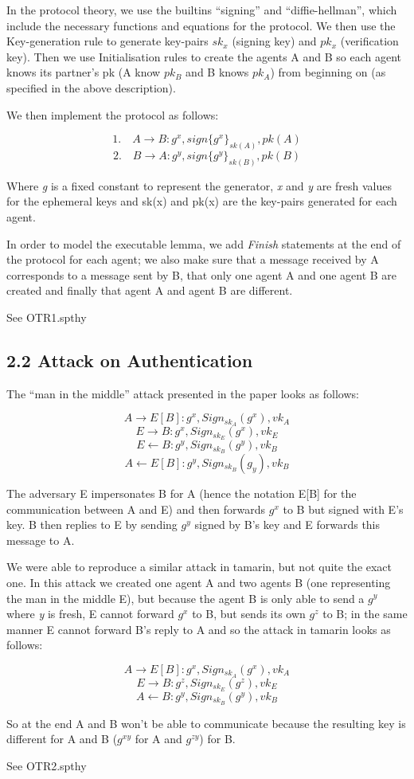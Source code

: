 \documentclass[
]{article}
\begin{document}
In the protocol theory, we use the builtins ``signing'' and
``diffie-hellman'', which include the necessary functions and equations for the protocol. We then use the Key-generation rule to generate key-pairs $sk_x$ (signing key) and $pk_x$ (verification key). Then we use Initialisation rules to create the agents A and B so each agent knows its partner's pk (A know $pk_B$ and B knows $pk_A$) from beginning on (as specified in the above description).

We then implement the protocol as follows:

\[ \text{1.} \quad A \rightarrow B: g^x, sign\{g^x\}_{sk(A)}, pk(A) \]
\[ \text{2.} \quad B \rightarrow A: g^y, sign\{g^y\}_{sk(B)}, pk(B) \]

Where \emph{g} is a fixed constant to represent the generator,
\emph{x} and \emph{y} are fresh values for the ephemeral keys and
sk(x) and pk(x) are the key-pairs generated for each agent.

In order to model the executable lemma, we add \emph{Finish} statements at the end of the protocol for each agent; we also make sure that a message received by A corresponds to a message sent by B, that only one agent A and one agent B are created and finally that agent A and agent B are different.

See OTR1.spthy

\newpage
\hypertarget{attack-on-authentication}{%
\subsection{2.2 Attack on Authentication}\label{attack-on-authentication}}

The ``man in the middle'' attack presented in the paper looks as follows:

\[A \rightarrow E[B] : g^x, Sign_{sk_A} (g^x), vk_A\]
\[E \rightarrow B : g^x, Sign_{sk_E} (g^x), vk_E\]
\[E \leftarrow B : g^y, Sign_{sk_B} (g^y), vk_B\]
\[A \leftarrow E[B] : g^y, Sign_{sk_B} (g_y), vk_B\]

The adversary E impersonates B for A (hence the notation E[B] for the communication between A and E) and then forwards $g^x$ to B but signed with E's key. B then replies to E by sending $g^y$ signed by B's key and E forwards this message to A.

We were able to reproduce a similar attack in tamarin, but not quite the exact one. In this attack we created one agent A and two agents B (one representing the man in the middle E), but because the agent B is only able to send a $g^y$ where \emph{y} is fresh, E cannot forward $g^x$ to B, but sends its own $g^z$ to B; in the same manner E cannot forward B's reply to A and so the attack in tamarin looks as follows:

\[A \rightarrow E[B] : g^x, Sign_{sk_A} (g^x), vk_A\]
\[E \rightarrow B : g^z, Sign_{sk_E} (g^z), vk_E\]
\[A \leftarrow B : g^y, Sign_{sk_B} (g^y), vk_B\]

So at the end A and B won't be able to communicate because the resulting key is different for A and B ($g^{xy}$ for A and $g^{zy }$) for B.

See OTR2.spthy
\end{document}
